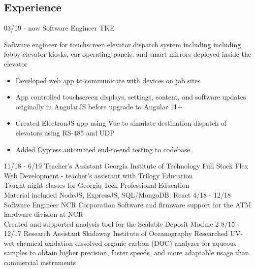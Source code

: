 \documentclass[]{cv}
\begin{document}
\begin{body}
	\section{Experience}
	\begin{entrylist}
		\entry
		{03/19 - now}
		{Software Engineer}
		{TKE}
		{Software engineer for touchscreen elevator dispatch system including including lobby elevator kiosks, car operating panels, and smart mirrors deployed inside the elevator
			\begin{itemize}
				\item {Developed web app to communicate with devices on job sites}
				\item {App controlled touchscreen displays, settings, content, and software updates originally in AngularJS before upgrade to Angular 11+}
				\item {Created ElectronJS app using Vue to simulate destination dispatch of elevators using RS-485 and UDP}
				\item {Added Cypress automated end-to-end testing to codebase}
			\end{itemize}
		}
		\entry
		{11/18 - 6/19}
		{Teacher's Assistant}
		{Georgia Institute of Technology}
		{Full Stack Flex Web Development - teacher's assistant with Trilogy Education\\
			Taught night classes for Georgia Tech Professional Education\\
			Material included NodeJS, ExpressJS, SQL/MongoDB, React}
		\entry
		{4/18 - 12/18}
		{Software Engineer}
		{NCR Corporation}
		{Software and firmware support for the ATM hardware division at NCR \\
			Created and supported analysis tool for the Scalable Deposit Module 2}
		\entry
		{8/15 - 12/17}
		{Research Assistant}
		{Skidaway Institute of Oceanography}
		{Researched UV-wet chemical oxidation dissolved organic carbon (DOC) analyzer for aqueous samples to obtain higher precision, faster speeds, and more adaptable usage than commercial instruments
}
\end{entrylist}
\end{body}
\end{document}
